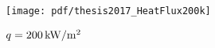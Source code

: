 \begin{figure}[h]
 \begin{center}
  \texttt{[image: pdf/thesis2017\_HeatFlux200k]}
  \vspace{0zh}
  \caption{$q=200\,\rm kW/m^2$}\label{HeatFlux=200k_with_mark}
 \end{center}
 \vspace{-2zh}
\end{figure}




%
%
%
%
